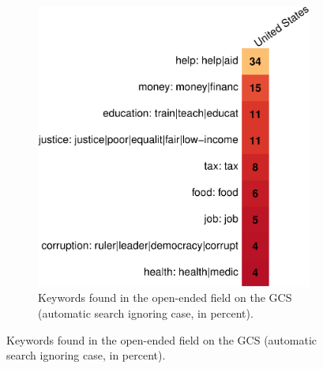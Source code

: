 \begin{figure}[h!]
\begin{subfigure}{.34\textwidth}
    \end{subfigure}
    \hspace{.02\textwidth}
    \begin{subfigure}{.64\textwidth}
        \caption{Keywords found in the open-ended field on the GCS (automatic search ignoring case, in percent).}
        \includegraphics[width=\textwidth]{../figures/country_comparison/poverty_field_contains_positive.pdf}    
    \end{subfigure}
    \end{figure}


